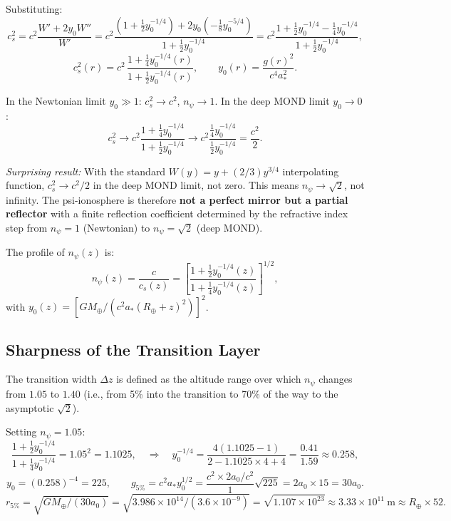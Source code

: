 \documentclass[aps,prd,twocolumn,superscriptaddress]{revtex4-2}
\newcommand{\npsi}{n_\psi}
\begin{document}
Substituting:
\begin{equation}
c_s^2 = c^2\frac{W' + 2y_0 W''}{W'}
= c^2\frac{(1+\frac{1}{2}y_0^{-1/4}) + 2y_0(-\frac{1}{8}y_0^{-5/4})}
         {1+\frac{1}{2}y_0^{-1/4}}
= c^2\frac{1 + \frac{1}{2}y_0^{-1/4} - \frac{1}{4}y_0^{-1/4}}
         {1+\frac{1}{2}y_0^{-1/4}},
\label{eq:cs2-interp}
\end{equation}
\begin{equation}
\boxed{
c_s^2(r) = c^2\,\frac{1 + \frac{1}{4}y_0^{-1/4}(r)}{1+\frac{1}{2}y_0^{-1/4}(r)},
\qquad
y_0(r) = \frac{g(r)^2}{c^4 a_*^2}.
}
\label{eq:cs2-profile}
\end{equation}

In the Newtonian limit $y_0 \gg 1$: $c_s^2 \to c^2$, $\npsi \to 1$.
In the deep MOND limit $y_0 \to 0$:
\begin{equation}
c_s^2 \to c^2\frac{1 + \frac{1}{4}y_0^{-1/4}}{1+\frac{1}{2}y_0^{-1/4}}
\to c^2 \frac{\frac{1}{4}y_0^{-1/4}}{\frac{1}{2}y_0^{-1/4}} = \frac{c^2}{2}.
\end{equation}

\textit{Surprising result:} With the standard $W(y) = y + (2/3)y^{3/4}$
interpolating function, $c_s^2 \to c^2/2$ in the deep MOND limit,
not zero.  This means $\npsi \to \sqrt{2}$, not infinity.  The
psi-ionosphere is therefore \textbf{not a perfect mirror but a partial
reflector} with a finite reflection coefficient determined by the
refractive index step from $\npsi = 1$ (Newtonian) to $\npsi = \sqrt{2}$
(deep MOND).

The profile of $\npsi(z)$ is:
\begin{equation}
\npsi(z) = \frac{c}{c_s(z)} = \left[
\frac{1+\frac{1}{2}y_0^{-1/4}(z)}{1+\frac{1}{4}y_0^{-1/4}(z)}
\right]^{1/2},
\label{eq:npsi-profile}
\end{equation}
with $y_0(z) = [GM_\oplus/(c^2 a_*(R_\oplus+z)^2)]^2$.

\subsection{Sharpness of the Transition Layer}

The transition width $\Delta z$ is defined as the altitude range over
which $\npsi$ changes from $1.05$ to $1.40$ (i.e., from 5\% into the
transition to 70\% of the way to the asymptotic $\sqrt{2}$).

Setting $\npsi = 1.05$:
\begin{equation}
\frac{1+\frac{1}{2}y_0^{-1/4}}{1+\frac{1}{4}y_0^{-1/4}} = 1.05^2 = 1.1025,
\quad\Rightarrow\quad
y_0^{-1/4} = \frac{4(1.1025-1)}{2 - 1.1025\times 4 + 4}
= \frac{0.41}{1.59} \approx 0.258,
\end{equation}
\begin{equation}
y_0 = (0.258)^{-4} = 225,
\qquad
g_{5\%} = c^2 a_* y_0^{1/2} = \frac{c^2 \times 2a_0/c^2}{\,1\,}\sqrt{225}
= 2a_0 \times 15 = 30 a_0.
\end{equation}
\begin{equation}
r_{5\%} = \sqrt{GM_\oplus/(30 a_0)} = \sqrt{3.986\times10^{14}/(3.6\times10^{-9})}
= \sqrt{1.107\times10^{23}} \approx 3.33\times10^{11}~\text{m} \approx R_\oplus\times 52.
\end{equation}
\end{document}
